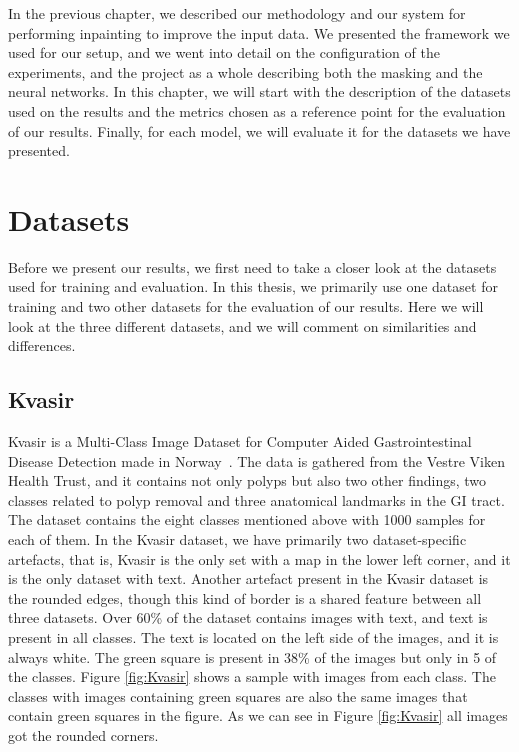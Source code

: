 In the previous chapter, we described our methodology and our system for performing inpainting to improve the input data. We presented the framework we used for our setup, and we went into detail on the configuration of the experiments, and the project as a whole describing both the masking and the neural networks. 
In this chapter, we will start with the description of the datasets used on the results and the metrics chosen as a reference point for the evaluation of our results. 
Finally, for each model, we will evaluate it for the datasets we have presented.

\section{Datasets}
Before we present our results, we first need to take a closer look at the datasets used for training and evaluation.
In this thesis, we primarily use one dataset for training and two other datasets for the evaluation of our results. Here we will look at the three different datasets, and we will comment on similarities and differences. 


\subsection{Kvasir}
Kvasir is a Multi-Class Image Dataset for Computer Aided Gastrointestinal Disease Detection made in Norway~\cite{Pogorelov:2017:KMI:3083187.3083212}. The data is gathered from the Vestre Viken Health Trust, and it contains not only polyps but also two other findings, two classes related to polyp removal and three anatomical landmarks in the GI tract.
The dataset contains the eight classes mentioned above with 1000 samples for each of them.  In the Kvasir dataset, we have primarily two dataset-specific artefacts, that is, Kvasir is the only set with a map in the lower left corner, and it is the only dataset with text. Another artefact present in the Kvasir dataset is the rounded edges, though this kind of border is a shared feature between all three datasets.
Over 60\% of the dataset contains images with text, and text is present in all classes. The text is located on the left side of the images, and it is always white.
The green square is present in 38\% of the images but only in 5 of the classes. Figure \ref{fig:Kvasir} shows a sample with images from each class. The classes with images containing green squares are also the same images that contain green squares in the figure.
As we can see in Figure \ref{fig:Kvasir} all images got the rounded corners.


